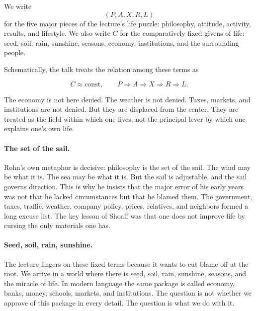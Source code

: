 \begin{definition}
We write
\[
(P,A,X,R,L)
\]
for the five major pieces of the lecture's life puzzle: philosophy, attitude, activity, results, and lifestyle. We also write \(C\) for the comparatively fixed givens of life: seed, soil, rain, sunshine, seasons, economy, institutions, and the surrounding people.
\end{definition}

Schematically, the talk treats the relation among these terms as

\begin{equation}
C \approx \text{const}, \qquad P \Rightarrow A \Rightarrow X \Rightarrow R \Rightarrow L.
\end{equation}

The economy is not here denied. The weather is not denied. Taxes, markets, and institutions are not denied. But they are displaced from the center. They are treated as the field within which one lives, not the principal lever by which one explains one's own life.

\paragraph{The set of the sail.}
Rohn's own metaphor is decisive: philosophy is the set of the sail. The wind may be what it is. The sea may be what it is. But the sail is adjustable, and the sail governs direction. This is why he insists that the major error of his early years was not that he lacked circumstances but that he blamed them. The government, taxes, traffic, weather, company policy, prices, relatives, and neighbors formed a long excuse list. The key lesson of Shoaff was that one does not improve life by cursing the only materials one has.

\paragraph{Seed, soil, rain, sunshine.}
The lecture lingers on these fixed terms because it wants to cut blame off at the root. We arrive in a world where there is seed, soil, rain, sunshine, seasons, and the miracle of life. In modern language the same package is called economy, banks, money, schools, markets, and institutions. The question is not whether we approve of this package in every detail. The question is what we do with it.


